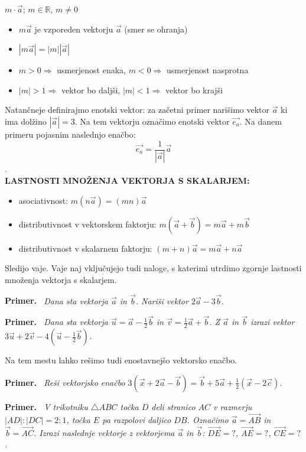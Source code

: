 \documentclass[a4paper,11pt]{article}
\newcommand{\RR}{\mathbb{R}}
\newenvironment{primer}{%
  \par\medskip\noindent\textbf{Primer.}\itshape\ }{\par\medskip}
\begin{document}
$m\cdot\vec{a}$; $m\in\RR$, $m\not=0$
\begin{itemize}
    \item $m\vec{a}$ je vzporeden vektorju $\vec{a}$ (smer se ohranja)
    \item $|m\vec{a}|=|m||\vec{a}|$
    \item $m>0\Rightarrow$ usmerjenost enaka, $m<0\Rightarrow$ usmerjenost nasprotna
    \item $|m|>1\Rightarrow$ vektor bo daljši, $|m|<1\Rightarrow$ vektor bo krajši
\end{itemize}
Natančneje definirajmo enotski vektor: za začetni primer narišimo vektor $\vec{a}$ ki ima dolžino $|\vec{a}|=3$. Na tem vektorju označimo enotski vektor $\vec{e_a}$. Na danem primeru pojasnim naslednjo enačbo: $$\vec{e_a}=\frac{1}{|\vec{a}|}\vec{a}$$.\\
\textbf{LASTNOSTI MNOŽENJA VEKTORJA S SKALARJEM:}
\begin{itemize}
    \item asociativnost: $m(n\vec{a})=(mn)\vec{a}$
    \item distributivnost v vektorskem faktorju: $m(\vec{a}+\vec{b})=m\vec{a}+m\vec{b}$
    \item distributivnost v skalarnem faktorju: $(m+n)\vec{a}=m\vec{a}+n\vec{a}$
\end{itemize}
Sledijo vaje. Vaje naj vključujejo tudi naloge, s katerimi utrdimo zgornje lastnosti množenja vektorja s skalarjem.\\
\begin{primer}
    Dana sta vektorja $\vec{a}$ in $\vec{b}$. Nariši vektor $2\vec{a}-3\vec{b}$.
\end{primer}
\begin{primer}
    Dana sta vektorja $\vec{u}=\vec{a}-\frac{1}{2}\vec{b}$ in $\vec{v}=\frac{1}{2}\vec{a}+\vec{b}$. Z $\vec{a}$ in $\vec{b}$ izrazi vektor $3\vec{u}+2\vec{v}-4(\vec{u}-\frac{1}{2}\vec{b})$.
\end{primer}
Na tem mestu lahko rešimo tudi enostavnejšo vektorsko enačbo.
\begin{primer}
    Reši vektorjsko enačbo $3(\vec{x}+2\vec{a}-\vec{b})=\vec{b}+5\vec{a}+\frac{1}{2}(\vec{x}-2\vec{c})$.
\end{primer}
\begin{primer}
    V trikotniku $\triangle ABC$ točka $D$ deli stranico $AC$ v razmerju $|AD|:|DC|=2:1$, točka $E$ pa razpolovi daljico $DB$. Označimo $\vec{a}=\vec{AB}$ in $\vec{b}=\vec{AC}$. Izrazi naslednje vektorje z vektorjema $\vec{a}$ in $\vec{b}$:  $\vec{DE}=?$, $\vec{AE}=?$, $\vec{CE}=?$.
\end{primer}
\end{document}
